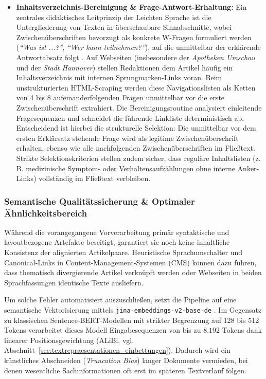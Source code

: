 \begin{itemize}
    \item \textbf{Inhaltsverzeichnis-Bereinigung \& Frage-Antwort-Erhaltung:} Ein zentrales didaktisches Leitprinzip der Leichten Sprache ist die Untergliederung von Texten in überschaubare Sinnabschnitte, wobei Zwischenüberschriften bevorzugt als konkrete W-Fragen formuliert werden (\textit{\enquote{Was ist ...?}}, \textit{\enquote{Wer kann teilnehmen?}}), auf die unmittelbar der erklärende Antwortabsatz folgt \citep{bmas2025ratgeber}. Auf Webseiten (insbesondere der \textit{Apotheken Umschau} und der \textit{Stadt Hannover}) stellen Redaktionen dem Artikel häufig ein Inhaltsverzeichnis mit internen Sprungmarken-Links voran. Beim unstrukturierten HTML-Scraping werden diese Navigationslisten als Ketten von 4 bis 8 aufeinanderfolgenden Fragen unmittelbar vor die erste Zwischenüberschrift extrahiert. Die Bereinigungsroutine analysiert einleitende Fragesequenzen und schneidet die führende Linkliste deterministisch ab. Entscheidend ist hierbei die strukturelle Selektion: Die unmittelbar vor dem ersten Erklärsatz stehende Frage wird als legitime Zwischenüberschrift erhalten, ebenso wie alle nachfolgenden Zwischenüberschriften im Fließtext. Strikte Selektionskriterien stellen zudem sicher, dass reguläre Inhaltslisten (z.\,B. medizinische Symptom- oder Verhaltensaufzählungen ohne interne Anker-Links) vollständig im Fließtext verbleiben.
\end{itemize}

\subsubsection{Semantische Qualitätssicherung \& Optimaler Ähnlichkeitsbereich}
\label{sec:quality_assurance_sweet_spot}

Während die vorangegangene Vorverarbeitung primär syntaktische und layoutbezogene Artefakte beseitigt, garantiert sie noch keine inhaltliche Konsistenz der alignierten Artikelpaare. Heuristische Sprachumschalter und Canonical-Links in Content-Management-Systemen (CMS) können dazu führen, dass thematisch divergierende Artikel verknüpft werden oder Webseiten in beiden Sprachfassungen identische Texte ausliefern. 

Um solche Fehler automatisiert auszuschließen, setzt die Pipeline auf eine semantische Vektorisierung mittels \texttt{jina-embeddings-v2-base-de} \citep{gunther2023jina}. Im Gegensatz zu klassischen Sentence-BERT-Modellen mit strikter Begrenzung auf 128 bis 512 Tokens verarbeitet dieses Modell Eingabesequenzen von bis zu $8.192$ Tokens dank linearer Positionsgewichtung (ALiBi, vgl. Abschnitt~\ref{sec:textrepraesentationen_einbettungen}). Dadurch wird ein künstliches Abschneiden (\textit{Truncation Bias}) langer Dokumente vermieden, bei denen wesentliche Sachinformationen oft erst im späteren Textverlauf folgen.

